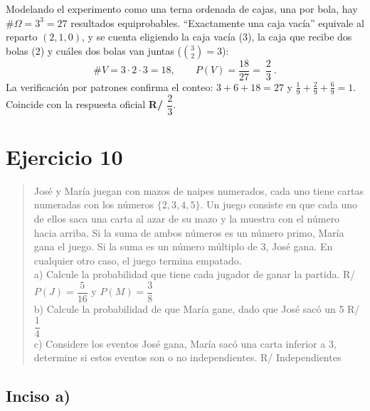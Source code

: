 \documentclass[11pt]{article}
\begin{document}
\begin{resp}
Modelando el experimento como una terna ordenada de cajas, una por bola, hay
$\#\Omega=3^{3}=27$ resultados equiprobables. ``Exactamente una caja vacía'' equivale al
reparto $(2,1,0)$, y se cuenta eligiendo la caja vacía ($3$), la caja que recibe dos bolas
($2$) y cuáles dos bolas van juntas ($\binom{3}{2}=3$):
\[
\#V=3\cdot 2\cdot 3=18,
\qquad
P(V)=\frac{18}{27}=\boxed{\ \frac{2}{3}\ }.
\]
La verificación por patrones confirma el conteo: $3+6+18=27$ y
$\frac19+\frac29+\frac69=1$. Coincide con la respuesta oficial \textbf{R/ $\dfrac{2}{3}$}.
\end{resp}

\section*{Ejercicio 10}

\begin{quote}
José y María juegan con mazos de naipes numerados, cada uno tiene cartas numeradas con los números $\{2,3,4,5\}$. Un juego consiste en que cada uno de ellos saca una carta al azar de su mazo y la muestra con el número hacia arriba. Si la suma de ambos números es un número primo, María gana el juego. Si la suma es un número múltiplo de 3, José gana. En cualquier otro caso, el juego termina empatado.\\[4pt]
a) Calcule la probabilidad que tiene cada jugador de ganar la partida. \hfill R/ $P(J)=\dfrac{5}{16}$ y $P(M)=\dfrac{3}{8}$\\[2pt]
b) Calcule la probabilidad de que María gane, dado que José sacó un 5 \hfill R/ $\dfrac{1}{4}$\\[2pt]
c) Considere los eventos José gana, María sacó una carta inferior a 3, determine si estos eventos son o no independientes. \hfill R/ Independientes
\end{quote}

\subsection*{Inciso a)}
\end{document}
